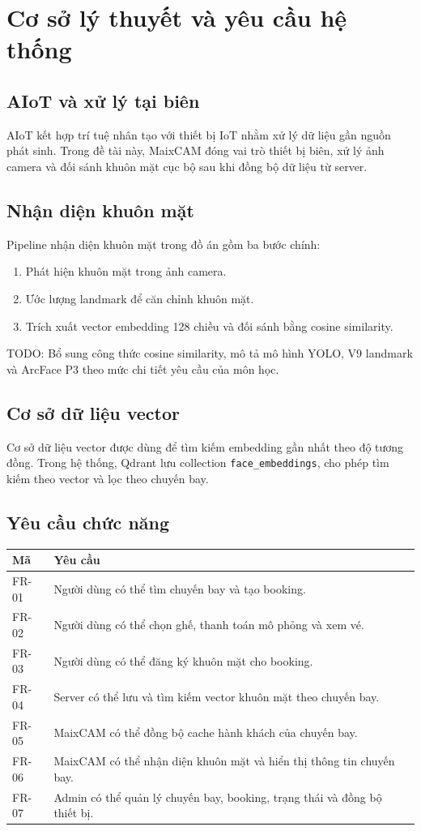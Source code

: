 \section{Cơ sở lý thuyết và yêu cầu hệ thống}

\subsection{AIoT và xử lý tại biên}
AIoT kết hợp trí tuệ nhân tạo với thiết bị IoT nhằm xử lý dữ liệu gần nguồn phát sinh. Trong đề tài này, MaixCAM đóng vai trò thiết bị biên, xử lý ảnh camera và đối sánh khuôn mặt cục bộ sau khi đồng bộ dữ liệu từ server.

\subsection{Nhận diện khuôn mặt}
Pipeline nhận diện khuôn mặt trong đồ án gồm ba bước chính:

\begin{enumerate}
  \item Phát hiện khuôn mặt trong ảnh camera.
  \item Ước lượng landmark để căn chỉnh khuôn mặt.
  \item Trích xuất vector embedding 128 chiều và đối sánh bằng cosine similarity.
\end{enumerate}

TODO: Bổ sung công thức cosine similarity, mô tả mô hình YOLO, V9 landmark và ArcFace P3 theo mức chi tiết yêu cầu của môn học.

\subsection{Cơ sở dữ liệu vector}
Cơ sở dữ liệu vector được dùng để tìm kiếm embedding gần nhất theo độ tương đồng. Trong hệ thống, Qdrant lưu collection \texttt{face\_embeddings}, cho phép tìm kiếm theo vector và lọc theo chuyến bay.

\subsection{Yêu cầu chức năng}
\begin{longtable}{p{}p{}}
\toprule
\textbf{Mã} & \textbf{Yêu cầu} \\
\midrule
FR-01 & Người dùng có thể tìm chuyến bay và tạo booking. \\
FR-02 & Người dùng có thể chọn ghế, thanh toán mô phỏng và xem vé. \\
FR-03 & Người dùng có thể đăng ký khuôn mặt cho booking. \\
FR-04 & Server có thể lưu và tìm kiếm vector khuôn mặt theo chuyến bay. \\
FR-05 & MaixCAM có thể đồng bộ cache hành khách của chuyến bay. \\
FR-06 & MaixCAM có thể nhận diện khuôn mặt và hiển thị thông tin chuyến bay. \\
FR-07 & Admin có thể quản lý chuyến bay, booking, trạng thái và đồng bộ thiết bị. \\
\bottomrule
\end{longtable}

